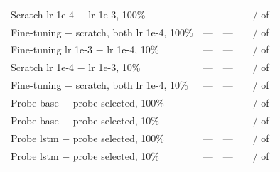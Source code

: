 \begin{tabular}{lcccc}
Scratch lr 1e-4 $-$ lr 1e-3, 100\% & --- & --- & \transferValDiffMeanLrOneEFourVsScratchFOneZeroZero{} & \transferValNBetterLrOneEFourVsScratchFOneZeroZero{} / \transferValNWorseLrOneEFourVsScratchFOneZeroZero{} of \transferValNComparedLrOneEFourVsScratchFOneZeroZero{} \\
Fine-tuning $-$ scratch, both lr 1e-4, 100\% & --- & --- & \transferValDiffMeanFinetuneVsScratchLrOneEFourFOneZeroZero{} & \transferValNBetterFinetuneVsScratchLrOneEFourFOneZeroZero{} / \transferValNWorseFinetuneVsScratchLrOneEFourFOneZeroZero{} of \transferValNComparedFinetuneVsScratchLrOneEFourFOneZeroZero{} \\
Fine-tuning lr 1e-3 $-$ lr 1e-4, 10\% & --- & --- & \transferValDiffMeanLrOneEThreeVsFinetuneFOneZero{} & \transferValNBetterLrOneEThreeVsFinetuneFOneZero{} / \transferValNWorseLrOneEThreeVsFinetuneFOneZero{} of \transferValNComparedLrOneEThreeVsFinetuneFOneZero{} \\
Scratch lr 1e-4 $-$ lr 1e-3, 10\% & --- & --- & \transferValDiffMeanLrOneEFourVsScratchFOneZero{} & \transferValNBetterLrOneEFourVsScratchFOneZero{} / \transferValNWorseLrOneEFourVsScratchFOneZero{} of \transferValNComparedLrOneEFourVsScratchFOneZero{} \\
Fine-tuning $-$ scratch, both lr 1e-4, 10\% & --- & --- & \transferValDiffMeanFinetuneVsScratchLrOneEFourFOneZero{} & \transferValNBetterFinetuneVsScratchLrOneEFourFOneZero{} / \transferValNWorseFinetuneVsScratchLrOneEFourFOneZero{} of \transferValNComparedFinetuneVsScratchLrOneEFourFOneZero{} \\
Probe base $-$ probe selected, 100\% & --- & --- & \transferValDiffMeanProbeBaseVsProbeFOneZeroZero{} & \transferValNBetterProbeBaseVsProbeFOneZeroZero{} / \transferValNWorseProbeBaseVsProbeFOneZeroZero{} of \transferValNComparedProbeBaseVsProbeFOneZeroZero{} \\
Probe base $-$ probe selected, 10\% & --- & --- & \transferValDiffMeanProbeBaseVsProbeFOneZero{} & \transferValNBetterProbeBaseVsProbeFOneZero{} / \transferValNWorseProbeBaseVsProbeFOneZero{} of \transferValNComparedProbeBaseVsProbeFOneZero{} \\
Probe lstm $-$ probe selected, 100\% & --- & --- & \transferValDiffMeanProbeLstmVsProbeFOneZeroZero{} & \transferValNBetterProbeLstmVsProbeFOneZeroZero{} / \transferValNWorseProbeLstmVsProbeFOneZeroZero{} of \transferValNComparedProbeLstmVsProbeFOneZeroZero{} \\
Probe lstm $-$ probe selected, 10\% & --- & --- & \transferValDiffMeanProbeLstmVsProbeFOneZero{} & \transferValNBetterProbeLstmVsProbeFOneZero{} / \transferValNWorseProbeLstmVsProbeFOneZero{} of \transferValNComparedProbeLstmVsProbeFOneZero{} \\

\end{tabular}
